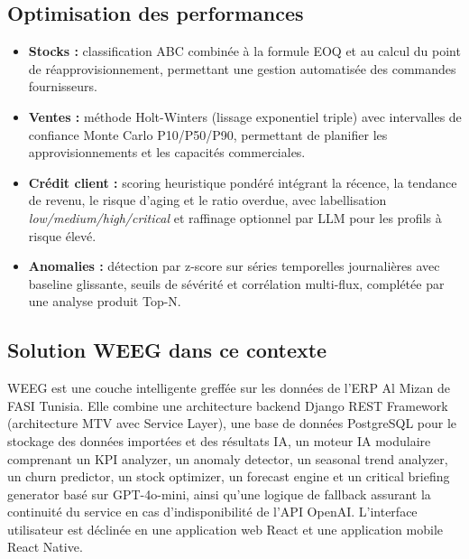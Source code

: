 \documentclass[a4paper,12pt]{report}
\begin{document}
\subsection{Optimisation des performances}

\begin{itemize}
    \item \textbf{Stocks :} classification ABC combinée à la formule EOQ et au
    calcul du point de réapprovisionnement, permettant une gestion automatisée
    des commandes fournisseurs.

    \item \textbf{Ventes :} méthode Holt-Winters (lissage exponentiel triple)
    avec intervalles de confiance Monte Carlo P10/P50/P90, permettant de
    planifier les approvisionnements et les capacités commerciales.

    \item \textbf{Crédit client :} scoring heuristique pondéré intégrant la
    récence, la tendance de revenu, le risque d'aging et le ratio overdue, avec
    labellisation \textit{low/medium/high/critical} et raffinage optionnel par LLM
    pour les profils à risque élevé.

    \item \textbf{Anomalies :} détection par z-score sur séries temporelles
    journalières avec baseline glissante, seuils de sévérité et corrélation
    multi-flux, complétée par une analyse produit Top-N.
\end{itemize}

\subsection{Solution WEEG dans ce contexte}

WEEG est une couche intelligente greffée sur les données de l'ERP Al Mizan de
FASI Tunisia. Elle combine une architecture backend Django REST Framework
(architecture MTV avec Service Layer), une base de données PostgreSQL pour le
stockage des données importées et des résultats IA, un moteur IA modulaire
comprenant un KPI analyzer, un anomaly detector, un seasonal trend analyzer, un
churn predictor, un stock optimizer, un forecast engine et un
critical briefing generator basé sur GPT-4o-mini, ainsi qu'une logique de
fallback assurant la continuité du service en cas d'indisponibilité de l'API
OpenAI. L'interface utilisateur est déclinée en une application web React et une
application mobile React Native.
\end{document}
